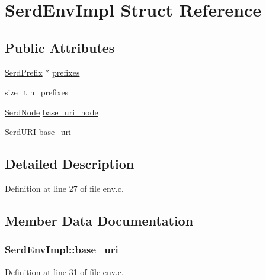 \hypertarget{struct_serd_env_impl}{}\section{Serd\+Env\+Impl Struct Reference}
\label{struct_serd_env_impl}
\subsection*{Public Attributes}
\begin{DoxyCompactItemize}
\item 
\hyperlink{struct_serd_prefix}{Serd\+Prefix} $\ast$ \hyperlink{struct_serd_env_impl_a3ff80ef06baff51d8783d8b2cd060310}{prefixes}
\item 
size\+\_\+t \hyperlink{struct_serd_env_impl_ade5f0b3ae658bb11b34cebb1ccfa2fa4}{n\+\_\+prefixes}
\item 
\hyperlink{struct_serd_node}{Serd\+Node} \hyperlink{struct_serd_env_impl_af7ea84f52cd19c49647302d0e2942b84}{base\+\_\+uri\+\_\+node}
\item 
\hyperlink{struct_serd_u_r_i}{Serd\+U\+RI} \hyperlink{struct_serd_env_impl_a99b7f37d4b5972a8748905f0939faa29}{base\+\_\+uri}
\end{DoxyCompactItemize}


\subsection{Detailed Description}


Definition at line 27 of file env.\+c.



\subsection{Member Data Documentation}
\subsubsection[{\texorpdfstring{base\+\_\+uri}{base_uri}}]{ Serd\+Env\+Impl\+::base\+\_\+uri}\hypertarget{struct_serd_env_impl_a99b7f37d4b5972a8748905f0939faa29}{}\label{struct_serd_env_impl_a99b7f37d4b5972a8748905f0939faa29}


Definition at line 31 of file env.\+c.

